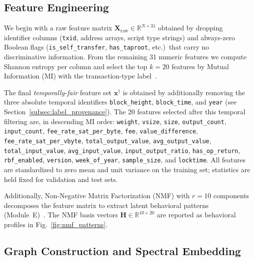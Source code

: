 
\subsection{Feature Engineering}
\label{subsec:features}

We begin with a raw feature matrix $\mathbf{X}_{\text{raw}} \in \mathbb{R}^{N \times 31}$
obtained by dropping identifier columns (\texttt{txid}, address arrays,
script type strings) and always-zero Boolean flags
(\texttt{is\_self\_transfer}, \texttt{has\_taproot}, etc.)\ that carry no
discriminative information.
From the remaining 31 numeric features we compute Shannon entropy per column
and select the top $k = 20$ features by Mutual Information (MI) with the
transaction-type label~\cite{Kraskov2004}.

The final \emph{temporally-fair} feature set $\mathbf{x}^{\dagger}$
is obtained by additionally removing the three absolute temporal identifiers
\texttt{block\_height}, \texttt{block\_time}, and \texttt{year}
(see Section~\ref{subsec:label_provenance}).
The 20 features selected after this temporal filtering are, in descending
MI order: \texttt{weight}, \texttt{vsize}, \texttt{size}, \texttt{output\_count},
\texttt{input\_count}, \texttt{fee\_rate\_sat\_per\_byte}, \texttt{fee},
\texttt{value\_difference}, \texttt{fee\_rate\_sat\_per\_vbyte},
\texttt{total\_output\_value}, \texttt{avg\_output\_value},
\texttt{total\_input\_value}, \texttt{avg\_input\_value},
\texttt{input\_output\_ratio}, \texttt{has\_op\_return}, \texttt{rbf\_enabled},
\texttt{version}, \texttt{week\_of\_year}, \texttt{sample\_size},
and \texttt{locktime}.
All features are standardized to zero mean and unit variance on the training
set; statistics are held fixed for validation and test sets.

Additionally, Non-Negative Matrix Factorization (NMF) with $r = 10$ components
decomposes the feature matrix to extract latent behavioral patterns
(Module~E)~\cite{Lee1999}.
The NMF basis vectors $\mathbf{H} \in \mathbb{R}^{10 \times 20}$ are reported
as behavioral profiles in Fig.~\ref{fig:nmf_patterns}.


\subsection{Graph Construction and Spectral Embedding}
\label{subsec:graph}

